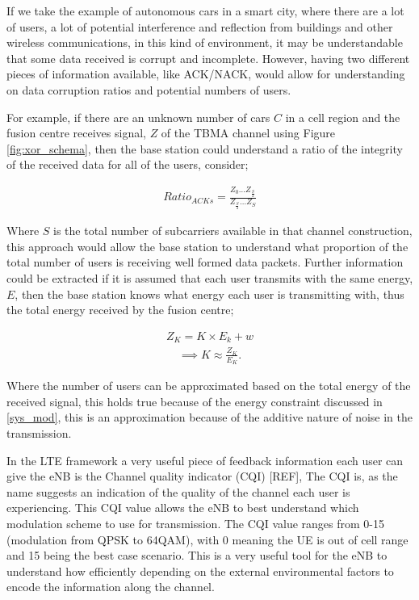 \documentclass{article}
\begin{document}
If we take the example of autonomous cars in a smart city, where there are a lot of users, a lot of potential interference and reflection from buildings and other wireless communications, in this kind of environment, it may be understandable that some data received is corrupt and incomplete. However, having two different pieces of information available, like ACK/NACK, would allow for understanding on data corruption ratios and potential numbers of users. 

For example, if there are an unknown number of cars $C$ in a cell region and the fusion centre receives signal, $Z$ of the TBMA channel using Figure \ref{fig:xor_schema}, then the base station could understand a ratio of the integrity of the received data for all of the users, consider;

\begin{align}
    Ratio_{ACKs} = \frac{Z_{0}\ldots Z_{\frac{S}{2}}}{Z_{\frac{S}{2}}\ldots Z_{S}}
\end{align}

Where $S$ is the total number of subcarriers available in that channel construction, this approach would allow the base station to understand what proportion of the total number of users is receiving well formed data packets. Further information could be extracted if it is assumed that each user transmits with the same energy, $E$, then the base station knows what energy each user is transmitting with, thus the total energy received by the fusion centre;

\begin{align}
    Z_{K}  = K \times E_{k} + w
\end{align}
\begin{align}
    \implies K \approx \frac{Z_{K}}{E_{K}}.
\end{align}

Where the number of users can be approximated based on the total energy of the received signal, this holds true because of the energy constraint discussed in \cref{sys_mod}, this is an approximation because of the additive nature of noise in the transmission. 

In the LTE framework a very useful piece of feedback information each user can give the eNB is the Channel quality indicator (CQI) [REF], The CQI is, as the name suggests an indication of the quality of the channel each user is experiencing. This CQI value allows the eNB to best understand which modulation scheme to use for transmission. The CQI value ranges from 0-15 (modulation from QPSK to 64QAM), with 0 meaning the UE is out of cell range and 15 being the best case scenario. This is a very useful tool for the eNB to understand how efficiently depending on the external environmental factors to encode the information along the channel. 
\end{document}
